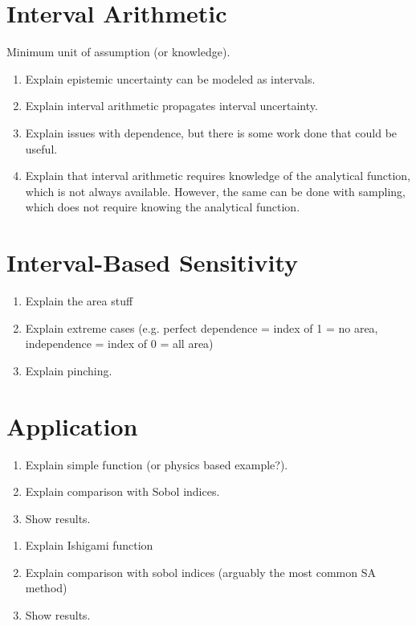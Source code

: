 \documentclass[twocolumn]{rps-esrl2020}
\begin{document}
\section{Interval Arithmetic}

Minimum unit of assumption (or knowledge).

\begin{enumerate}
	\item Explain epistemic uncertainty can be modeled as intervals.
	\item Explain interval arithmetic propagates interval uncertainty.
	\item Explain issues with dependence, but there is some work done that could be useful.
	\item Explain that interval arithmetic requires knowledge of the analytical function, which is not
	always available. However, the same can be done with sampling, which does not require knowing the analytical function.
\end{enumerate}

\section{Interval-Based Sensitivity}

\begin{enumerate}
	\item Explain the area stuff
	\item Explain extreme cases (e.g. perfect dependence = index of 1 = no area, independence = index of 0 = all area)
	\item Explain pinching.
\end{enumerate}

\section{Application}

\begin{enumerate}
	\item Explain simple function (or physics based example?).
	\item Explain comparison with Sobol indices.
	\item Show results.
\end{enumerate}

\begin{enumerate}
	\item Explain Ishigami function
	\item Explain comparison with sobol indices (arguably the most common SA method)
	\item Show results.
\end{enumerate}
\end{document}
